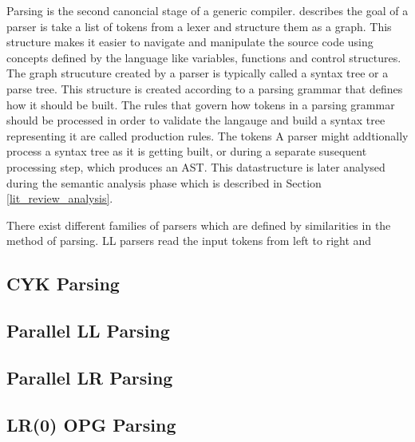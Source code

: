 \cite{mark_thierry_vandevoorde_parallel_1988, alblas_bibliography_1994}

Parsing is the second canoncial stage of a generic compiler.
\cite{scott_programming_2015} describes the goal of a parser is take a list
of tokens from a lexer and structure them as a graph. This structure makes it
easier to navigate and manipulate the source code using concepts defined by the
language like variables, functions and control structures. The graph strucuture
created by a parser is typically called a syntax tree or a parse tree. This
structure is created according to a parsing grammar that defines how it should
be built. The rules that govern how tokens in a parsing grammar should be
processed in order to validate the langauge and build a syntax tree representing
it are called production rules. The tokens A parser might addtionally process a syntax
tree as it is getting built, or during a separate susequent processing step,
which produces an AST. This datastructure is later analysed during the semantic
analysis phase which is described in Section \ref{lit_review_analysis}.

There exist different families of parsers which are defined by similarities  in
the method of parsing. LL parsers read the input tokens from left to right and


\subsection{CYK Parsing}
\cite{skrzypczak_parallel_nodate}

\subsection{Parallel LL Parsing}
\cite{robin_voetter_parallel_2021}

\subsection{Parallel LR Parsing}
\cite{clarke_error_1993}

\subsection{LR(0) OPG Parsing}
\cite{barenghi_parallel_2015, li_associative_2023}


